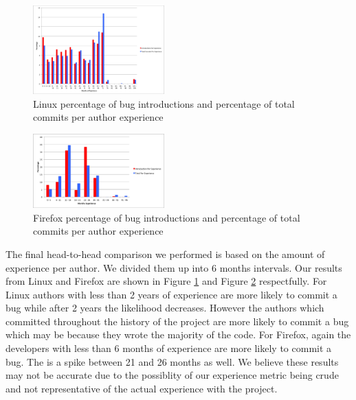 \begin{figure}
\begin{center}
\includegraphics[width=0.45\textwidth]{linux_day_per_experience.png}
\end{center}
\caption{Linux percentage of bug introductions and percentage of total commits per author experience}
\label{fig-linux-experience}
\end{figure}

\begin{figure}
\begin{center}
\includegraphics[width=0.45\textwidth]{firefox_day_per_experience.png}
\end{center}
\caption{Firefox percentage of bug introductions and percentage of total commits per author experience}
\label{fig-firefox-experience}
\end{figure}

The final head-to-head comparison we performed is based on the amount
of experience per author. We divided them up into 6 months intervals. 
Our results from Linux and Firefox are shown in Figure
\ref{fig-linux-experience} and Figure \ref{fig-firefox-experience}
respectfully. For Linux authors with less than 2 years of experience
are more likely to commit a bug while after 2 years the likelihood
decreases. However the authors which committed throughout the history
of the project are more likely to commit a bug which may be because
they wrote the majority of the code. For Firefox, again the
developers with less than 6 months of experience are more likely to
commit a bug. The is a spike between 21 and 26 months as well. We
believe these results may not be accurate due to the possiblity of
our experience metric being crude and not representative of the 
actual experience with the project.

